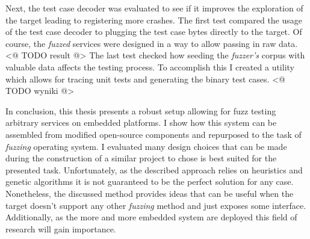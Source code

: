 Next, the test case decoder was evaluated to see if it improves the exploration of the target leading to registering more crashes. The first test compared the usage of the test case decoder to plugging the test case bytes directly to the target. Of course, the \textit{fuzzed} services were designed in a way to allow passing in raw data. <@ TODO result @> The last test checked how seeding the \textit{fuzzer's} corpus with valuable data affects the testing process. To accomplish this I created a utility which allows for tracing unit tests and generating the binary test cases. <@ TODO wyniki @>

In conclusion, this thesis presents a robust setup allowing for fuzz testing arbitrary services on embedded platforms. I show how this system can be assembled from modified open-source components and repurposed to the task of \textit{fuzzing} operating system. I evaluated many design choices that can be made during the construction of a similar project to chose is best suited for the presented task. Unfortunately, as the described approach relies on heuristics and genetic algorithms it is not guaranteed to be the perfect solution for any case. Nonetheless, the discussed method provides ideas that can be useful when the target doesn't support any other \textit{fuzzing} method and just exposes some interface. Additionally, as the more and more embedded system are deployed this field of research will gain importance.